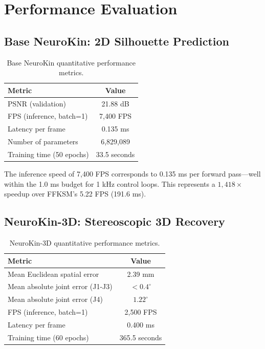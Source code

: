 \documentclass[12pt,a4paper,oneside]{report}
\begin{document}
\section{Performance Evaluation}

\subsection{Base NeuroKin: 2D Silhouette Prediction}

\begin{table}[H]
\centering
\caption{Base NeuroKin quantitative performance metrics.}
\label{tab:neurokin_performance}
\begin{tabular}{lc}
\toprule
Metric & Value \\
\midrule
PSNR (validation) & 21.88 dB \\
FPS (inference, batch=1) & 7,400 FPS \\
Latency per frame & 0.135 ms \\
Number of parameters & 6,829,089 \\
Training time (50 epochs) & 33.5 seconds \\
\bottomrule
\end{tabular}
\end{table}

The inference speed of 7,400 FPS corresponds to 0.135 ms per forward pass—well within the 1.0 ms budget for 1 kHz control loops. This represents a $1,418\times$ speedup over FFKSM's 5.22 FPS (191.6 ms).

\subsection{NeuroKin-3D: Stereoscopic 3D Recovery}

\begin{table}[H]
\centering
\caption{NeuroKin-3D quantitative performance metrics.}
\label{tab:neurokin3d_performance}
\begin{tabular}{lc}
\toprule
Metric & Value \\
\midrule
Mean Euclidean spatial error & 2.39 mm \\
Mean absolute joint error (J1-J3) & $<0.4^\circ$ \\
Mean absolute joint error (J4) & $1.22^\circ$ \\
FPS (inference, batch=1) & 2,500 FPS \\
Latency per frame & 0.400 ms \\
Training time (60 epochs) & 365.5 seconds \\
\bottomrule
\end{tabular}
\end{table}
\end{document}
